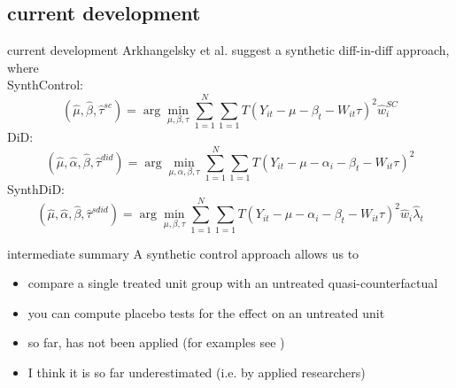 \documentclass[aspectratio=169]{beamer}
\begin{document}
	\subsection{current development}
		\begin{frame}{current development}
			Arkhangelsky et al. \citeyear{Arkhangelsky2019} suggest a synthetic diff-in-diff approach, where \\ \vspace*{.15cm}
			SynthControl:
			\begin{equation}
				(\hat{\mu}, \hat{\beta}, \hat{\tau}^{sc}) = \arg\min_{\mu, \beta, \tau}  \sum_{1=1}^{N} \sum_{1=1}{T} \left(Y_{it} - \mu - \beta_t - W_{it}\tau \right)^2 \hat{w}_i^{SC}
			\end{equation}
			DiD:
			\begin{equation}
				(\hat{\mu}, \hat{\alpha}, \hat{\beta}, \hat{\tau}^{did}) = \arg\min_{\mu, \alpha, \beta, \tau}  \sum_{1=1}^{N} \sum_{1=1}{T} \left(Y_{it} - \mu - \alpha_i -\beta_t - W_{it}\tau \right)^2
			\end{equation}
			SynthDiD:
			\begin{equation}
				(\hat{\mu}, \hat{\alpha}, \hat{\beta}, \hat{\tau}^{sdid}) = \arg\min_{\mu, \beta, \tau}  \sum_{1=1}^{N} \sum_{1=1}{T} \left(Y_{it} - \mu - \alpha_i -\beta_t - W_{it}\tau \right)^2 \hat{w}_i \hat{\lambda}_t
			\end{equation}
		\end{frame}

		\begin{frame}{intermediate summary}
			A synthetic control approach allows us to \\ \vspace*{.5cm}
			\begin{itemize}
				\item compare a single treated unit group with an untreated quasi-counterfactual
				\item you can compute placebo tests for the effect on an untreated unit
				\item so far, has not been  applied (for examples see \cite{Abadie2020})
				\item I think it is so far underestimated (i.e. by applied researchers)
			\end{itemize}
		\end{frame}
\end{document}

